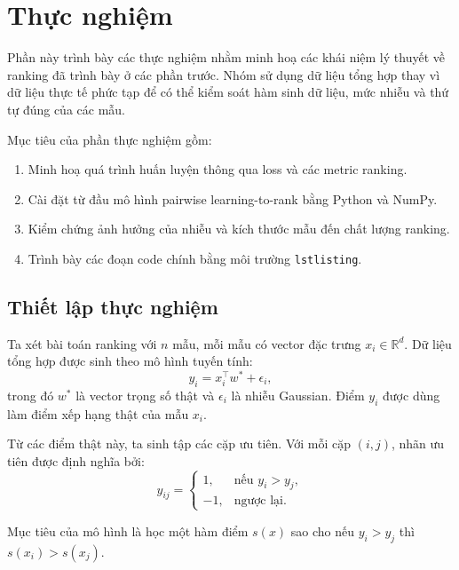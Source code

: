 \section{Thực nghiệm}

Phần này trình bày các thực nghiệm nhằm minh hoạ các khái niệm lý thuyết về ranking đã trình bày ở các phần trước. Nhóm sử dụng dữ liệu tổng hợp thay vì dữ liệu thực tế phức tạp để có thể kiểm soát hàm sinh dữ liệu, mức nhiễu và thứ tự đúng của các mẫu.

Mục tiêu của phần thực nghiệm gồm:
\begin{enumerate}
    \item Minh hoạ quá trình huấn luyện thông qua loss và các metric ranking.
    \item Cài đặt từ đầu mô hình pairwise learning-to-rank bằng Python và NumPy.
    \item Kiểm chứng ảnh hưởng của nhiễu và kích thước mẫu đến chất lượng ranking.
    \item Trình bày các đoạn code chính bằng môi trường \texttt{lstlisting}.
\end{enumerate}

\subsection{Thiết lập thực nghiệm}

Ta xét bài toán ranking với \(n\) mẫu, mỗi mẫu có vector đặc trưng \(x_i \in \mathbb{R}^d\). Dữ liệu tổng hợp được sinh theo mô hình tuyến tính:
\begin{equation}
    y_i = x_i^\top w^\ast + \epsilon_i,
    \label{eq:experiment-data-generating-model}
\end{equation}
trong đó \(w^\ast\) là vector trọng số thật và \(\epsilon_i\) là nhiễu Gaussian. Điểm \(y_i\) được dùng làm điểm xếp hạng thật của mẫu \(x_i\).

Từ các điểm thật này, ta sinh tập các cặp ưu tiên. Với mỗi cặp \((i,j)\), nhãn ưu tiên được định nghĩa bởi:
\begin{equation}
    y_{ij} =
    \begin{cases}
        1, & \text{nếu } y_i > y_j, \\
        -1, & \text{ngược lại.}
    \end{cases}
    \label{eq:experiment-pairwise-label}
\end{equation}

Mục tiêu của mô hình là học một hàm điểm \(s(x)\) sao cho nếu \(y_i > y_j\) thì \(s(x_i) > s(x_j)\).

